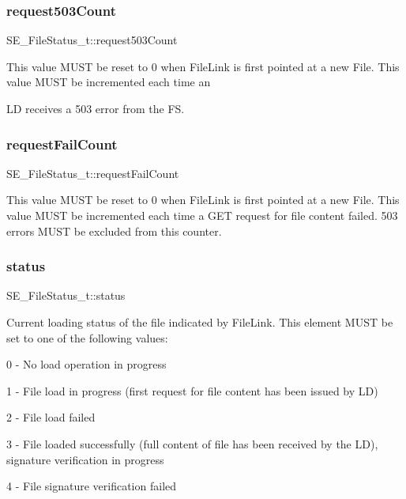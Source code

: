 \subsubsection{\texorpdfstring{request503\+Count}{request503Count}}
{\footnotesize\ttfamily S\+E\+\_\+\+File\+Status\+\_\+t\+::request503\+Count}

This value M\+U\+ST be reset to 0 when File\+Link is first pointed at a new File. This value M\+U\+ST be incremented each time an

LD receives a 503 error from the FS. \mbox{\label{group__FileStatus_ga225fff3f05549ecacea2c1f2ce1b4776}} 
\subsubsection{\texorpdfstring{request\+Fail\+Count}{requestFailCount}}
{\footnotesize\ttfamily S\+E\+\_\+\+File\+Status\+\_\+t\+::request\+Fail\+Count}

This value M\+U\+ST be reset to 0 when File\+Link is first pointed at a new File. This value M\+U\+ST be incremented each time a G\+ET request for file content failed. 503 errors M\+U\+ST be excluded from this counter. \mbox{\label{group__FileStatus_ga5ec878ed781a4fa3d9a7530017df562a}} 
\subsubsection{\texorpdfstring{status}{status}}
{\footnotesize\ttfamily S\+E\+\_\+\+File\+Status\+\_\+t\+::status}

Current loading status of the file indicated by File\+Link. This element M\+U\+ST be set to one of the following values\+:

0 -\/ No load operation in progress

1 -\/ File load in progress (first request for file content has been issued by LD)

2 -\/ File load failed

3 -\/ File loaded successfully (full content of file has been received by the LD), signature verification in progress

4 -\/ File signature verification failed

